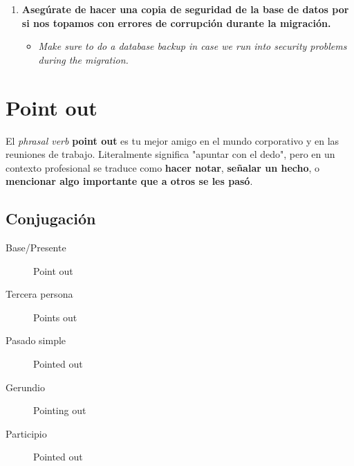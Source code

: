 \documentclass[
10pt, %
a4paper, %
oneside, %
headinclude,footinclude, %
BCOR5mm, %
]{scrartcl}
\begin{document}
\begin{enumerate}
	\begin{itemize}
		\item \textit{We had everything planned, but we ran into a terrible storm on the way to the mountains.}
	\end{itemize}
	\item \textbf{Asegúrate de hacer una copia de seguridad de la base de datos por si nos topamos con errores de corrupción durante la migración.}
	\begin{itemize}
		\item \textit{Make sure to do a database backup in case we run into security problems during the migration.}
	\end{itemize}
\end{enumerate}

\newpage

\section{Point out}
El \textit{phrasal verb} \textbf{point out} es tu mejor amigo en el mundo corporativo y en las reuniones de trabajo. Literalmente significa "apuntar con el dedo", pero en un contexto profesional se traduce como \textbf{hacer notar}, \textbf{señalar un hecho}, o \textbf{mencionar algo importante que a otros se les pasó}.

\subsection{Conjugación}
\begin{description}
	\item[Base/Presente] Point out
	\item[Tercera persona] Points out
	\item[Pasado simple] Pointed out
	\item[Gerundio] Pointing out
	\item[Participio] Pointed out
\end{description}
\end{document}
